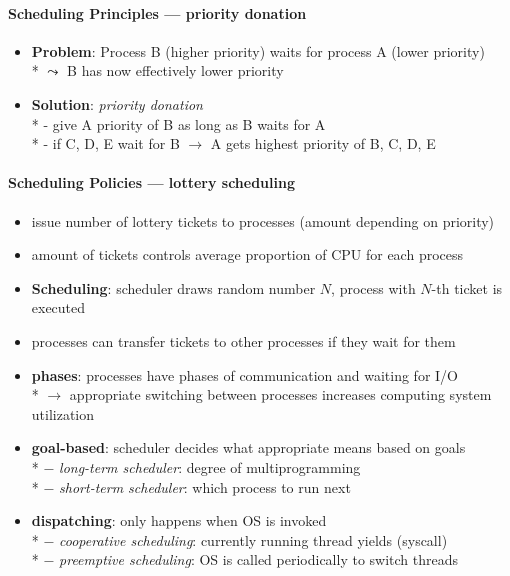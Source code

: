 \paragraph{Scheduling Principles --- priority donation}
\begin{itemize}
  \item \textbf{Problem}: Process B (higher priority) waits for process A (lower priority) \\*
    \( \leadsto \) B has now effectively lower priority
  \item \textbf{Solution}: \emph{priority donation} \\*
    - give A priority of B as long as B waits for A \\*
    - if C, D, E wait for B \( \to \) A gets highest priority of B, C, D, E
\end{itemize}

\paragraph{Scheduling Policies --- lottery scheduling}
\begin{itemize}
  \item issue number of lottery tickets to processes (amount depending on priority)
  \item amount of tickets controls average proportion of CPU for each process
  \item \textbf{Scheduling}: scheduler draws random number \( N \), process with \( N \)-th ticket is executed
  \item processes can transfer tickets to other processes if they wait for them
\end{itemize}

\begin{summary}
  \begin{itemize}
    \item \textbf{phases}: processes have phases of communication and waiting for I/O \\*
      $ \to $ appropriate switching between processes increases computing system utilization
    \item \textbf{goal-based}: scheduler decides what appropriate means based on goals \\*
      $ - $ \emph{long-term scheduler}: degree of multiprogramming \\*
      $ - $ \emph{short-term scheduler}: which process to run next
    \item \textbf{dispatching}: only happens when OS is invoked \\*
      $ - $ \emph{cooperative scheduling}: currently running thread yields (syscall) \\*
      $ - $ \emph{preemptive scheduling}: OS is called periodically to switch threads
  \end{itemize}
\end{summary}